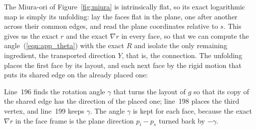The Miura-ori of Figure~\ref{fig:miura} is intrinsically flat, so its exact logarithmic map is simply its unfolding: lay the faces flat in the plane, one after another across their common edges, and read the plane coordinates relative to $s$. This gives us the exact $r$ and the exact $\nabla r$ in every face, so that we can compute the angle~(\ref{eqn:app_theta}) with the exact $R$ and isolate the only remaining ingredient, the transported direction $Y$, that is, the connection. The unfolding places the first face by its layout, and each next face by the rigid motion that puts its shared edge on the already placed one:

Line~196 finds the rotation angle $\gamma$ that turns the layout of $g$ so that its copy of the shared edge has the direction of the placed one; line~198 places the third vertex, and line~199 keeps $\gamma$. The angle $\gamma$ is kept for each face, because the exact $\nabla r$ in the face frame is the plane direction $p_i - p_s$ turned back by $-\gamma$.

